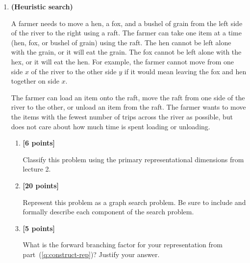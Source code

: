 \documentclass{article}
\newcounter{totalpoints}
\newcommand{\points}[1]{{\addtocounter{totalpoints}{#1}\textbf{[#1 points]}}}
\begin{document}
\begin{enumerate}
\begin{enumerate}
\item \points{5}
List the paths in the frontier at each step of a least cost search of the problem you specified in part~(\ref{q:uninformed-graph}). Also, highlight the path that will be removed from the frontier in that step. Stop when the path removed ends in a goal state.

\begin{answer}{1in}
\end{answer}

\end{enumerate}

\item \textbf{(Heuristic search)}

A farmer needs to move a hen, a fox, and a bushel of grain from the left side of the river to the right using a raft.
The farmer can take one item at a time (hen, fox, or bushel of grain) using the raft.
The hen cannot be left alone with the grain, or it will eat the grain.
The fox cannot be left alone with the hex, or it will eat the hen.
For example, the farmer cannot move from one side $x$ of the river to the other side $y$ if it would mean leaving the fox and hen together on side $x$.

The farmer can load an item onto the raft, move the raft from one side of the river to the other, or unload an item from the raft.  The farmer wants to move the items with the fewest number of trips across the river as possible, but does not care about how much time is spent loading or unloading.

\begin{enumerate}
\item \points{6} Classify this problem using the primary representational dimensions from lecture 2.

\begin{answer}{.5in}
\end{answer}

\item \points{20} \label{q:construct-rep}
Represent this problem as a graph search problem.
Be sure to include and formally describe each component of the search problem.

\begin{answer}{2.5in}
\end{answer}

\item \points{5}
What is the forward branching factor for your representation from part~(\ref{q:construct-rep})?  Justify your answer.


\end{enumerate}
\end{enumerate}
\end{document}
